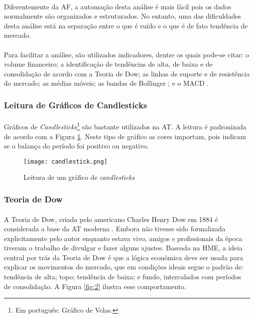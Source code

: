 \paragraph{} Diferentemente da AF, a automação desta análise é mais fácil pois os dados normalmente são organizados e estruturados. No entanto, uma das dificuldades desta análise está na separação entre o que é ruído e o que é de fato tendência de mercado.

\paragraph{} Para facilitar a análise, são utilizados indicadores, dentre os quais pode-se citar: o volume financeiro; a identificação de tendências de alta, de baixa e de consolidação de acordo com a Teoria de Dow; as linhas de suporte e de resistência do mercado; as médias móveis; as bandas de Bollinger \cite{bollinger2002bollinger}; e o MACD \cite{appel2007understanding}.


\FloatBarrier
\subsubsection*{Leitura de Gráficos de Candlesticks}

\paragraph{} Gráficos de \textit{Candlesticks}\footnote{Em português: Gráfico de Velas.} são bastante utilizados na AT. A leitura é padronizada de acordo com a Figura \ref{fig:1}. Neste tipo de gráfico as cores importam, pois indicam se o balanço do período foi positivo ou negativo.

\begin{figure}[!htb]
    \texttt{[image: candlestick.png]}
    \centering
    \caption{Leitura de um gráfico de \textit{candlesticks} \cite{candlestick}}
    \label{fig:1}
\end{figure}


\FloatBarrier
\subsubsection*{Teoria de Dow}

\paragraph{} A Teoria de Dow, criada pelo americano Charles Henry Dow em 1884 é considerada a base da AT moderna \cite{kirkpatrick2010technical}. Embora não tivesse sido formalizada explicitamente pelo autor enquanto estava vivo, amigos e profissionais da época tiveram o trabalho de divulgar e fazer alguns ajustes. Baseada na HME, a ideia central por trás da Teoria de Dow é que a lógica econômica deve ser usada para explicar os movimentos do mercado, que em condições ideais segue o padrão de: tendência de alta; topo; tendência de baixa; e fundo, intercalados com períodos de consolidação. A Figura \ref{fig:2} ilustra esse comportamento.

